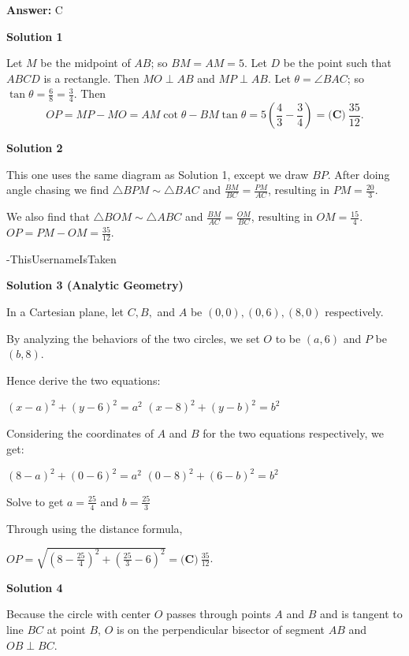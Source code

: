 \begin{enumerate}
 \textbf{Answer: }C



\textbf{Solution 1}

Let $M$ be the midpoint of $AB$; so $BM=AM=5$. Let $D$ be the point such that $ABCD$ is a rectangle. Then $MO\perp AB$ and $MP\perp AB$. Let $\theta = \angle BAC$; so $\tan\theta = \frac 68 = \frac 34$. Then
 \[OP=MP-MO=AM\cot\theta - BM\tan\theta = 5(\frac 43 - \frac 34) = \boxed{\textbf{(C)}\ \frac{35}{12}}.\]




\textbf{Solution 2}

This one uses the same diagram as Solution 1, except we draw $BP$. After doing angle chasing we find $\triangle BPM \sim \triangle BAC$ and $\frac{BM}{BC} = \frac{PM}{AC}$, resulting in $PM = \frac{20}{3}$.

 We also find that $\triangle BOM \sim \triangle ABC$ and $\frac{BM}{AC} = \frac{OM}{BC}$, resulting in $OM = \frac{15}{4}$. $OP = PM - OM = \frac{35}{12}$.

 -ThisUsernameIsTaken

 



\textbf{Solution 3 (Analytic Geometry)}

In a Cartesian plane, let $C, B,$ and $A$ be $(0,0),(0,6),(8,0)$ respectively.

 By analyzing the behaviors of the two circles, we set $O$ to be $(a,6)$ and $P$ be $(b,8)$.

 Hence derive the two equations:

 $(x-a)^2+(y-6)^2=a^2$
$(x-8)^2+(y-b)^2=b^2$

 
Considering the coordinates of $A$ and $B$ for the two equations respectively, we get:

 $(8-a)^2+(0-6)^2=a^2$
$(0-8)^2+(6-b)^2=b^2$

 Solve to get $a=\frac{25}{4}$ and $b=\frac{25}{3}$

 
Through using the distance formula,

 $OP=\sqrt{(8-\frac{25}{4})^2+(\frac{25}{3}-6)^2}= \boxed{\textbf{(C)}\ \frac{35}{12}}$.

 



\textbf{Solution 4}

Because the circle with center $O$ passes through points $A$ and $B$ and is tangent to line $BC$ at point $B$, $O$ is on the perpendicular bisector of segment $AB$ and $OB \perp BC$.


\end{enumerate}
